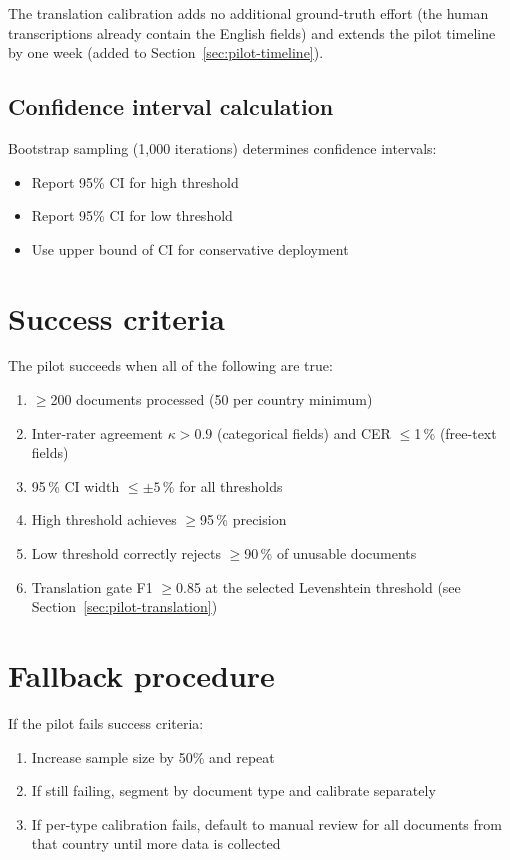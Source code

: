 \documentclass[11pt,a4paper,twoside]{report}
\begin{document}
\noindent
The translation calibration adds no additional ground-truth effort
(the human transcriptions already contain the English fields) and
extends the pilot timeline by one week (added to
Section~\ref{sec:pilot-timeline}).

\subsection{Confidence interval calculation}

Bootstrap sampling (1,000 iterations) determines confidence intervals:
\begin{itemize}
\item Report 95\% CI for high threshold
\item Report 95\% CI for low threshold
\item Use upper bound of CI for conservative deployment
\end{itemize}

\section{Success criteria}\label{sec:pilot-success}

The pilot succeeds when all of the following are true:
\begin{enumerate}
\item $\geq$200 documents processed (50 per country minimum)
\item Inter-rater agreement $\kappa > 0.9$ (categorical fields)
and CER $\le$1\,\% (free-text fields)
\item 95\,\% CI width $\leq \pm 5\,\%$ for all thresholds
\item High threshold achieves $\geq$95\,\% precision
\item Low threshold correctly rejects $\geq$90\,\% of unusable documents
\item Translation gate F1 $\geq$0.85 at the selected Levenshtein
threshold (see Section~\ref{sec:pilot-translation})
\end{enumerate}

\section{Fallback procedure}

If the pilot fails success criteria:
\begin{enumerate}
\item Increase sample size by 50\% and repeat
\item If still failing, segment by document type and calibrate separately
\item If per-type calibration fails, default to manual review for all
documents from that country until more data is collected
\end{enumerate}
\end{document}
